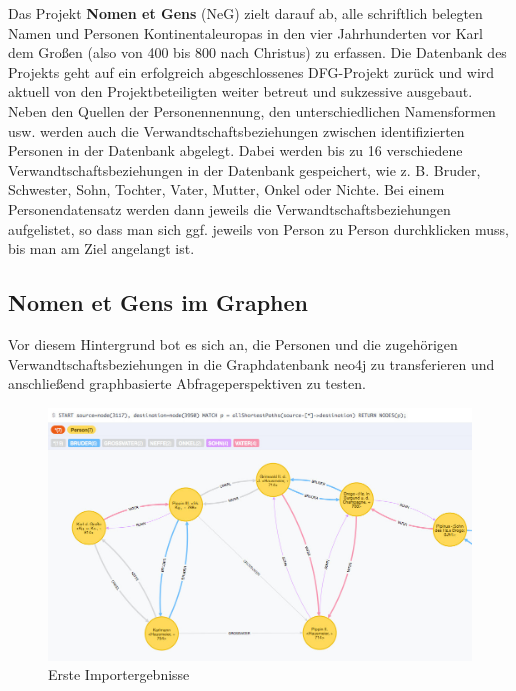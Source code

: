\documentclass[12pt,ngerman,]{article}
\begin{document}
Das Projekt \textbf{Nomen et Gens} (NeG) zielt darauf ab, alle
schriftlich belegten Namen und Personen Kontinentaleuropas in den vier
Jahrhunderten vor Karl dem Großen (also von 400 bis 800 nach Christus)
zu erfassen. Die Datenbank des Projekts geht auf ein erfolgreich
abgeschlossenes DFG-Projekt zurück und wird aktuell von den
Projektbeteiligten weiter betreut und sukzessive ausgebaut. Neben den
Quellen der Personennennung, den unterschiedlichen Namensformen usw.
werden auch die Verwandtschaftsbeziehungen zwischen identifizierten
Personen in der Datenbank abgelegt. Dabei werden bis zu 16 verschiedene
Verwandtschaftsbeziehungen in der Datenbank gespeichert, wie z. B.
Bruder, Schwester, Sohn, Tochter, Vater, Mutter, Onkel oder Nichte. Bei
einem Personendatensatz werden dann jeweils die
Verwandtschaftsbeziehungen aufgelistet, so dass man sich ggf. jeweils
von Person zu Person durchklicken muss, bis man am Ziel angelangt ist.

\subsection{Nomen et Gens im Graphen}\label{nomen-et-gens-im-graphen}

Vor diesem Hintergrund bot es sich an, die Personen und die zugehörigen
Verwandtschaftsbeziehungen in die Graphdatenbank neo4j zu transferieren
und anschließend graphbasierte Abfrageperspektiven zu testen.

\begin{figure}
\centering
\includegraphics{Bilder/NeG/020-Verwandschaften.jpg}
\caption{Erste Importergebnisse}
\end{figure}
\end{document}
